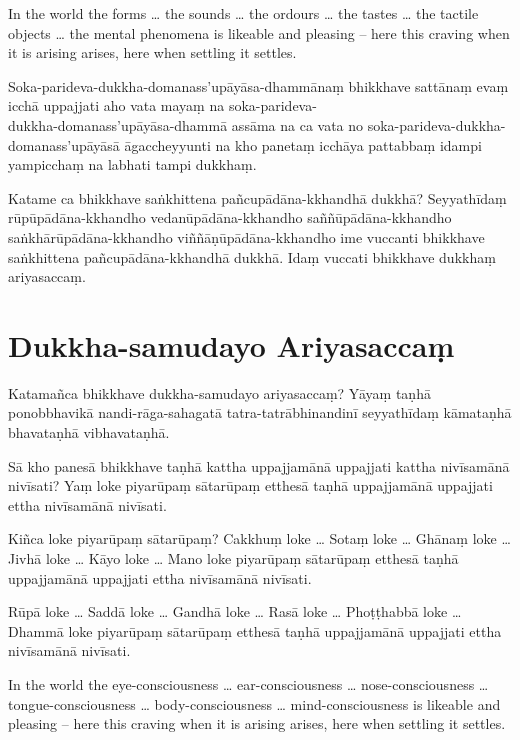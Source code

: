 In the world the forms \ldots{} the sounds \ldots{} the ordours \ldots{} the
tastes \ldots{} the tactile objects \ldots{} the mental phenomena is likeable
and pleasing -- here this craving when it is arising arises, here when settling
it settles.

\paliPage

Soka-parideva-dukkha-domanass'upāyāsa-dhammānaṃ bhikkhave sattānaṃ evaṃ icchā
uppajjati aho vata mayaṃ na soka-parideva-\\
dukkha-domanass'upāyāsa-dhammā assāma na
ca vata no soka-parideva-dukkha-domanass'upāyāsā āgaccheyyunti na kho panetaṃ
icchāya pattabbaṃ idampi yampicchaṃ na labhati tampi dukkhaṃ.

Katame ca bhikkhave saṅkhittena pañcupādāna-kkhandhā dukkhā? Seyyathīdaṃ
rūpūpādāna-kkhandho vedanūpādāna-kkhandho saññūpādāna-kkhandho
saṅkhārūpādāna-kkhandho viññāṇūpādāna-kkhandho ime vuccanti bhikkhave saṅkhittena
pañcupādāna-kkhandhā dukkhā. Idaṃ vuccati bhikkhave dukkhaṃ ariyasaccaṃ.

\section*{Dukkha-samudayo Ariyasaccaṃ}

Katamañca bhikkhave dukkha-samudayo ariyasaccaṃ? Yāyaṃ taṇhā ponobbhavikā
nandi-rāga-sahagatā tatra-tatrābhinandinī seyyathīdaṃ kāmataṇhā bhavataṇhā
vibhavataṇhā.

Sā kho panesā bhikkhave taṇhā kattha uppajjamānā uppajjati kattha nivīsamānā
nivīsati? Yaṃ loke piyarūpaṃ sātarūpaṃ etthesā taṇhā uppajjamānā uppajjati ettha
nivīsamānā nivīsati.

Kiñca loke piyarūpaṃ sātarūpaṃ? Cakkhuṃ loke \ldots{} Sotaṃ loke \ldots{} Ghānaṃ
loke \ldots{} Jivhā loke \ldots{} Kāyo loke \ldots{} Mano loke piyarūpaṃ
sātarūpaṃ etthesā taṇhā uppajjamānā uppajjati ettha nivīsamānā nivīsati.

Rūpā loke \ldots{} Saddā loke \ldots{} Gandhā loke \ldots{} Rasā loke \ldots{}
Phoṭṭhabbā loke \ldots{} Dhammā loke piyarūpaṃ sātarūpaṃ etthesā taṇhā
uppajjamānā uppajjati ettha nivīsamānā nivīsati.

\englishPage

In the world the eye-consciousness \ldots{} ear-consciousness \ldots{} nose-consciousness
 \ldots{} tongue-consciousness \ldots{} body-consciousness \ldots{} mind-consciousness is likeable
and pleasing -- here this craving when it is arising arises, here when settling
it settles.

